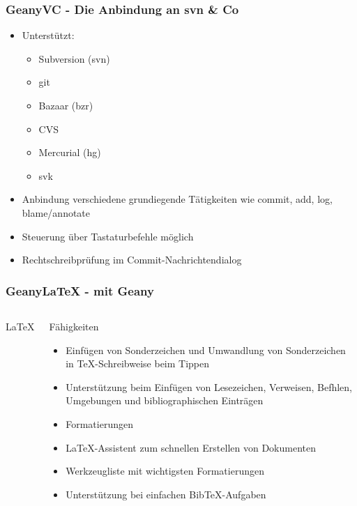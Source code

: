 \begin{frame}
  \frametitle{GeanyVC - Die Anbindung an svn \& Co}
  \begin{block}{}
    \begin{itemize}
    \item Unterstützt:
      \begin{itemize}
      \item Subversion (svn)
      \item git
      \item Bazaar (bzr)
      \item CVS
      \item Mercurial (hg)
      \item svk
      \end{itemize}
    \item Anbindung verschiedene grundiegende Tätigkeiten wie commit,
      add, log, blame/annotate
    \item Steuerung über Tastaturbefehle möglich
    \item Rechtschreibprüfung im Commit-Nachrichtendialog
    \end{itemize}
  \end{block}
\end{frame}

\begin{frame}
  \frametitle{Geany\LaTeX{} - \LaTeXe mit Geany}
  \begin{columns}[c]
    \column[c]{1.5cm} \huge \LaTeX 
    \column{8.5cm} \normalsize
    \begin{block}{Fähigkeiten}
      \begin{itemize}
      \item Einfügen von Sonderzeichen und Umwandlung von
        Sonderzeichen in \TeX-Schreibweise beim Tippen
      \item Unterstützung beim Einfügen von Lesezeichen, Verweisen,
        Befhlen, Umgebungen und bibliographischen Einträgen
      \item Formatierungen
      \item \LaTeX-Assistent zum schnellen Erstellen von Dokumenten
      \item Werkzeugliste mit wichtigsten Formatierungen
      \item Unterstützung bei einfachen BibTeX-Aufgaben
      \end{itemize}
    \end{block}
  \end{columns}
\end{frame}


